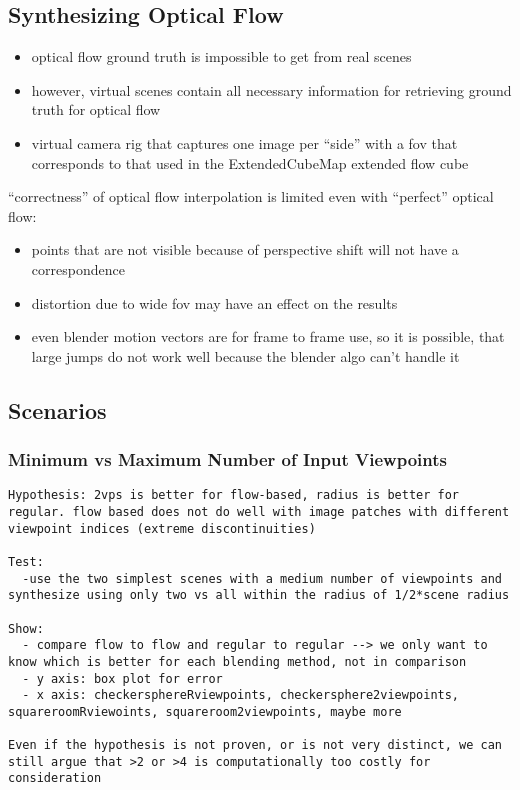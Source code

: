 \subsection{Synthesizing Optical Flow}
\begin{itemize}
  \item optical flow ground truth is impossible to get from real scenes
  \item however, virtual scenes contain all necessary information for retrieving ground truth for optical flow
  \item virtual camera rig that captures one image per ``side'' with a fov that corresponds to that used in the ExtendedCubeMap \ar extended flow cube
\end{itemize}

``correctness'' of optical flow interpolation is limited even with ``perfect'' optical flow:
\begin{itemize}
   \item points that are not visible because of perspective shift will not have a correspondence
   \item distortion due to wide fov may have an effect on the results
   \item even blender motion vectors are for frame to frame use, so it is possible, that large jumps do not work well because the blender algo can't handle it
\end{itemize}

\subsection{Scenarios}
\subsubsection{Minimum vs Maximum Number of Input Viewpoints}
\begin{verbatim}
Hypothesis: 2vps is better for flow-based, radius is better for regular. flow based does not do well with image patches with different viewpoint indices (extreme discontinuities)

Test: 
  -use the two simplest scenes with a medium number of viewpoints and synthesize using only two vs all within the radius of 1/2*scene radius

Show: 
  - compare flow to flow and regular to regular --> we only want to know which is better for each blending method, not in comparison
  - y axis: box plot for error
  - x axis: checkersphereRviewpoints, checkersphere2viewpoints, squareroomRviewoints, squareroom2viewpoints, maybe more

Even if the hypothesis is not proven, or is not very distinct, we can still argue that >2 or >4 is computationally too costly for consideration

\end{verbatim}

